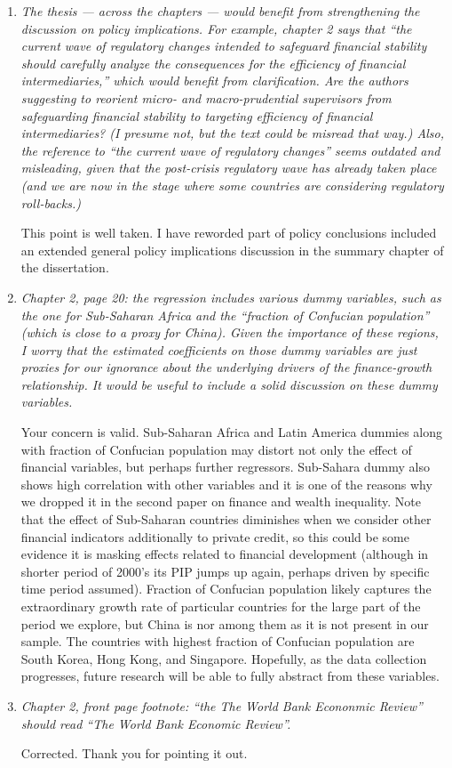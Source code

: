 \begin{enumerate}
    \item \textit{The thesis --- across the chapters --- would benefit from strengthening the discussion on policy implications. For example, chapter 2 says that ``the current wave of regulatory changes intended to safeguard financial stability should carefully analyze the consequences for the efficiency of financial intermediaries,'' which would benefit from clarification. Are the authors suggesting to reorient micro- and macro-prudential supervisors from safeguarding financial stability to targeting efficiency of financial intermediaries? (I presume not, but the text could be misread that way.) Also, the reference to ``the current wave of regulatory changes'' seems outdated and misleading, given that the post-crisis regulatory wave has already taken place (and we are now in the stage where some countries are considering regulatory roll-backs.)}
    
    This point is well taken. I have reworded part of policy conclusions included an extended general policy implications discussion in the summary chapter of the dissertation.

    \item \textit{Chapter 2, page 20: the regression includes various dummy variables, such as the one for Sub-Saharan Africa and the ``fraction of Confucian population'' (which is close to a proxy for China). Given the importance of these regions, I worry that the estimated coefficients on those dummy variables are just proxies for our ignorance about the underlying drivers of the finance-growth relationship. It would be useful to include a solid discussion on these dummy variables.}
    
    Your concern is valid. Sub-Saharan Africa and Latin America dummies along with fraction of Confucian population may distort not only the effect of financial variables, but perhaps further regressors. Sub-Sahara dummy also shows high correlation with other variables and it is one of the reasons why we dropped it in the second paper on finance and wealth inequality. Note that the effect of Sub-Saharan countries diminishes when we consider other financial indicators additionally to private credit, so this could be some evidence it is masking effects related to financial development (although in shorter period of 2000's its \ac{PIP} jumps up again, perhaps driven by specific time period assumed). Fraction of Confucian population likely captures the extraordinary growth rate of particular countries for the large part of the period we explore, but China is nor among them as it is not present in our sample. The countries with highest fraction of Confucian population are South Korea, Hong Kong, and Singapore. Hopefully, as the data collection progresses, future research will be able to fully abstract from these variables. 

    \item \textit{Chapter 2, front page footnote: ``the The World Bank Econonmic Review'' should read ``The World Bank Economic Review''.}
    
    Corrected. Thank you for pointing it out.
\end{enumerate}

\clearpage
\printbibliography[heading=subbibliography]
